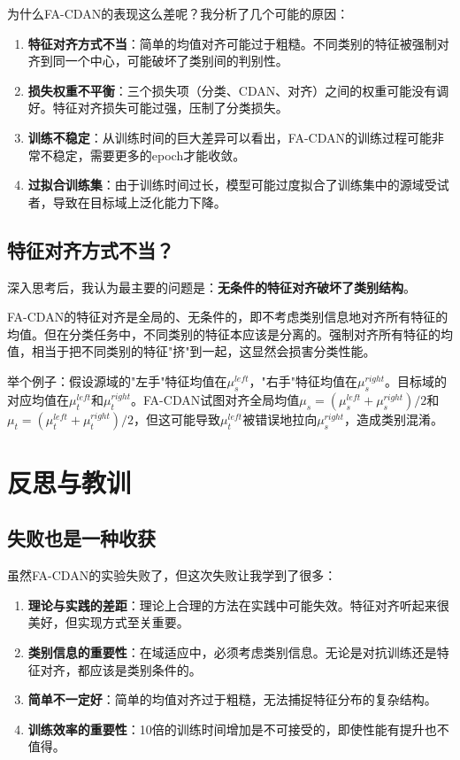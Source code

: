 \documentclass[12pt,a4paper]{ctexart}
\begin{document}
为什么FA-CDAN的表现这么差呢？我分析了几个可能的原因：

\begin{enumerate}
    \item \textbf{特征对齐方式不当}：简单的均值对齐可能过于粗糙。不同类别的特征被强制对齐到同一个中心，可能破坏了类别间的判别性。
    
    \item \textbf{损失权重不平衡}：三个损失项（分类、CDAN、对齐）之间的权重可能没有调好。特征对齐损失可能过强，压制了分类损失。
    
    \item \textbf{训练不稳定}：从训练时间的巨大差异可以看出，FA-CDAN的训练过程可能非常不稳定，需要更多的epoch才能收敛。
    
    \item \textbf{过拟合训练集}：由于训练时间过长，模型可能过度拟合了训练集中的源域受试者，导致在目标域上泛化能力下降。
\end{enumerate}

\subsection{特征对齐方式不当？}

深入思考后，我认为最主要的问题是：\textbf{无条件的特征对齐破坏了类别结构}。

FA-CDAN的特征对齐是全局的、无条件的，即不考虑类别信息地对齐所有特征的均值。但在分类任务中，不同类别的特征本应该是分离的。强制对齐所有特征的均值，相当于把不同类别的特征"挤"到一起，这显然会损害分类性能。

举个例子：假设源域的"左手"特征均值在$\mu_s^{left}$，"右手"特征均值在$\mu_s^{right}$。目标域的对应均值在$\mu_t^{left}$和$\mu_t^{right}$。FA-CDAN试图对齐全局均值$\mu_s = (\mu_s^{left} + \mu_s^{right})/2$和$\mu_t = (\mu_t^{left} + \mu_t^{right})/2$，但这可能导致$\mu_t^{left}$被错误地拉向$\mu_s^{right}$，造成类别混淆。

\section{反思与教训}

\subsection{失败也是一种收获}

虽然FA-CDAN的实验失败了，但这次失败让我学到了很多：

\begin{enumerate}
    \item \textbf{理论与实践的差距}：理论上合理的方法在实践中可能失效。特征对齐听起来很美好，但实现方式至关重要。
    
    \item \textbf{类别信息的重要性}：在域适应中，必须考虑类别信息。无论是对抗训练还是特征对齐，都应该是类别条件的。
    
    \item \textbf{简单不一定好}：简单的均值对齐过于粗糙，无法捕捉特征分布的复杂结构。
    
    \item \textbf{训练效率的重要性}：10倍的训练时间增加是不可接受的，即使性能有提升也不值得。
\end{enumerate}
\end{document}
